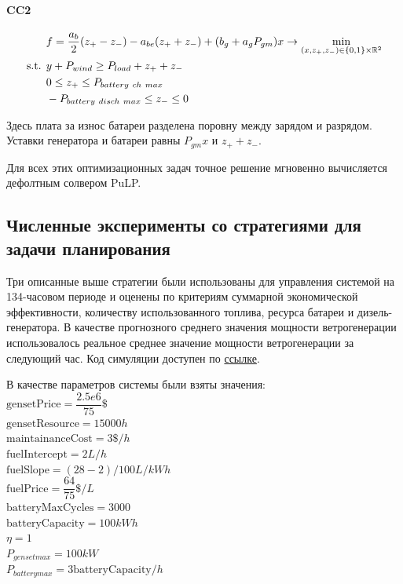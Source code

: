 \paragraph{CC2}

\begin{equation}\label{f:cc2}
\begin{split}
&f = \frac{a_b}{2}(z_+ - z_-) - a_{be}(z_+ + z_-)
+ (b_g  + a_g P_{gm}) x
\rightarrow \min\limits_{(x, z_+, z_-) \in \{0,1\} \times \mathbb{R}^2 }\\
\text{s.t. }& y + P_{wind} \geq P_{load} + z_+ + z_-\\
&0 \leq z_+ \leq P_{battery~ch~max} \\
&-P_{battery~disch~max} \leq z_- \leq 0 \\
\end{split}
\end{equation}


Здесь плата за износ батареи разделена поровну между зарядом и разрядом.
Уставки генератора и батареи равны $P_{gm}x$ и $z_+ + z_-$.

\medskip
Для всех этих оптимизационных задач точное решение мгновенно вычисляется дефолтным солвером PuLP.

\subsection{Численные эксперименты со стратегиями для задачи планирования}
\label{sec:planning_numeric}

Три описанные выше стратегии были использованы для управления системой на 134-часовом периоде и оценены по критериям суммарной экономической эффективности, количеству использованного топлива,  ресурса батареи и дизель-генератора.
В качестве прогнозного среднего значения мощности ветрогенерации использовалось реальное среднее значение мощности ветрогенерации за следующий час. 
Код симуляции доступен по \href{https://github.com/niquepolice/master-thesis-code/blob/9afefbad02c59e66c195c28e71ff626e79764cb2/milp.ipynb}{ссылке}.

В качестве параметров системы были взяты значения:\\
$\text{gensetPrice} = \dfrac{2.5e6}{75}\$$\\
$\text{gensetResource} = 15000h$\\
$\text{maintainanceCost} = 3\$/h$\\
$\text{fuelIntercept} = 2L/h$\\
$\text{fuelSlope} = (28-2)/100 L/kWh$\\
$\text{fuelPrice} = \dfrac{64}{75}\$/L$\\
$\text{batteryMaxCycles} = 3000$\\
$\text{batteryCapacity} = 100kWh$\\
$\eta = 1$ \\
$P_{genset max} = 100kW$ \\
$P_{battery max} = 3\text{batteryCapacity} / h$

